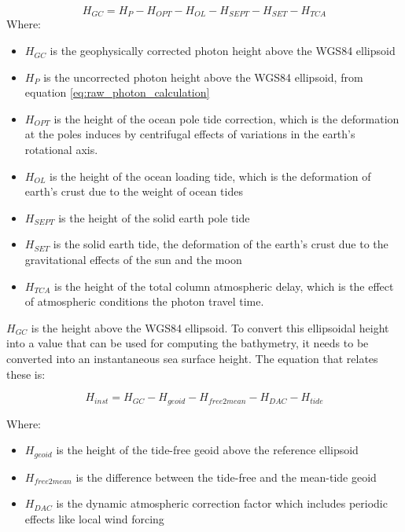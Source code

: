 \begin{equation}
      H_{GC} =  H_{P} - H_{OPT} - H_{OL} - H_{SEPT} - H_{SET} - H_{TCA}
\end{equation}
Where:

\begin{itemize}
      \item \(H_{GC}\) is the geophysically corrected photon height above the WGS84 ellipsoid
      \item \(H_{P}\) is the uncorrected photon height above the WGS84 ellipsoid, from equation \ref{eq:raw_photon_calculation}
      \item \(H_{OPT}\) is the height of the ocean pole tide correction, which is the deformation at the poles induces by centrifugal effects of variations in the earth's rotational axis.
      \item \(H_{OL}\) is the height of the ocean loading tide, which is the deformation of earth's crust due to the weight of ocean tides
      \item \(H_{SEPT}\) is the height of the solid earth pole tide
      \item \(H_{SET}\) is the solid earth tide, the deformation of the earth's crust due to the gravitational effects of the sun and the moon
      \item \(H_{TCA}\) is the height of the total column atmospheric delay, which is the effect of atmospheric conditions the photon travel time.
\end{itemize}

$H_{GC}$ is the height above the WGS84 ellipsoid. To convert this ellipsoidal height into a value that can be used for computing the bathymetry, it needs to be converted into an instantaneous sea surface height. The equation that relates these is:

\begin{equation}
      H_{inst} = H_{GC} - H_{geoid} - H_{free2mean} - H_{DAC} - H_{tide}
\end{equation}

Where:
\begin{itemize}
      \item $H_{geoid}$ is the height of the tide-free geoid above the reference ellipsoid
      \item $H_{free2mean}$ is the difference between the tide-free and the mean-tide geoid
      \item $H_{DAC}$ is the dynamic atmospheric correction factor which includes periodic effects like local wind forcing
\end{itemize}


